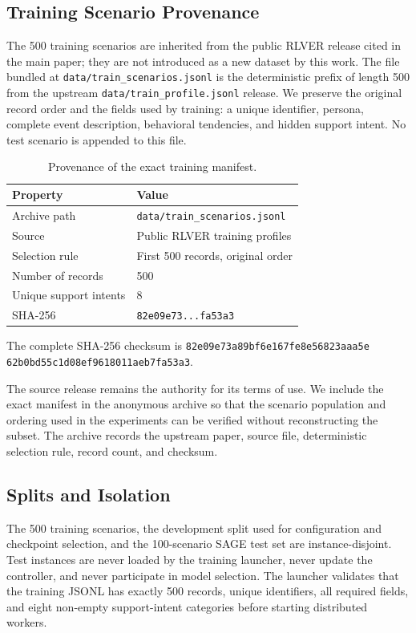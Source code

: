 \subsection{Training Scenario Provenance}
The 500 training scenarios are inherited from the public RLVER release cited
in the main paper; they are not introduced as a new dataset by this work. The
file bundled at \texttt{data/train\_scenarios.jsonl} is the deterministic prefix
of length 500 from the upstream \texttt{data/train\_profile.jsonl} release. We
preserve the original record order and the fields used by training: a unique
identifier, persona, complete event description, behavioral tendencies, and
hidden support intent. No test scenario is appended to this file.

\begin{table}[t]
\centering
\small
\begin{tabular}{ll}
\toprule
Property & Value \\
\midrule
Archive path & \texttt{data/train\_scenarios.jsonl} \\
Source & Public RLVER training profiles \\
Selection rule & First 500 records, original order \\
Number of records & 500 \\
Unique support intents & 8 \\
SHA-256 & \texttt{82e09e73...fa53a3} \\
\bottomrule
\end{tabular}
\caption{Provenance of the exact training manifest.}
\label{tab:supp-data-provenance}
\end{table}

The complete SHA-256 checksum is
\texttt{82e09e73a89bf6e167fe8e56823aaa5e}\linebreak
\texttt{62b0bd55c1d08ef9618011aeb7fa53a3}.

The source release remains the authority for its terms of use. We include the
exact manifest in the anonymous archive so that the scenario population and
ordering used in the experiments can be verified without reconstructing the
subset. The archive records the upstream paper, source file, deterministic
selection rule, record count, and checksum.

\subsection{Splits and Isolation}
The 500 training scenarios, the development split used for configuration and
checkpoint selection, and the 100-scenario SAGE test set are instance-disjoint.
Test instances are never loaded by the training launcher, never update the
controller, and never participate in model selection. The launcher validates
that the training JSONL has exactly 500 records, unique identifiers, all
required fields, and eight non-empty support-intent categories before starting
distributed workers.

